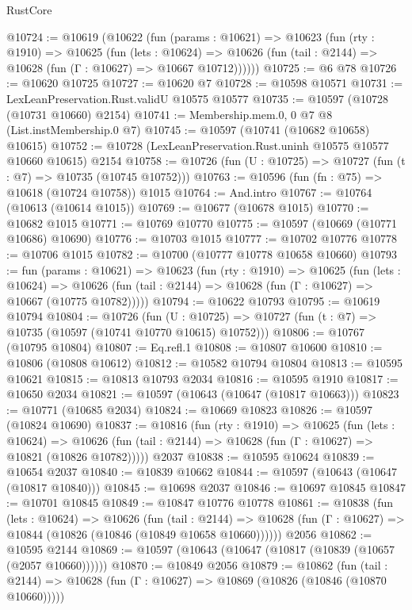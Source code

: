 \begin{lexlean}{RustCore}
\begin{coremodule}
@10724 := @10619
    (@10622
      (fun (params : @10621) =>
      @10623
        (fun (rty : @1910) =>
        @10625
          (fun (lets : @10624) =>
          @10626 (fun (tail : @2144) => @10628 (fun (Γ : @10627) => @10667 @10712))))))
@10725 := @6 @78
@10726 := @10620 @10725
@10727 := @10620 @7
@10728 := @10598 @10571
@10731 := LexLeanPreservation.Rust.validU @10575 @10577
@10735 := @10597 (@10728 (@10731 @10660) @2154)
@10741 := Membership.mem.{0, 0} @7 @8 (List.instMembership.{0} @7)
@10745 := @10597 (@10741 (@10682 @10658) @10615)
@10752 := @10728 (LexLeanPreservation.Rust.uninh @10575 @10577 @10660 @10615) @2154
@10758 := @10726 (fun (U : @10725) => @10727 (fun (t : @7) => @10735 (@10745 @10752)))
@10763 := @10596 (fun (fn : @75) => @10618 (@10724 @10758)) @1015
@10764 := And.intro
@10767 := @10764 (@10613 (@10614 @1015))
@10769 := @10677 (@10678 @1015)
@10770 := @10682 @1015
@10771 := @10769 @10770
@10775 := @10597 (@10669 (@10771 @10686) @10690)
@10776 := @10703 @1015
@10777 := @10702 @10776
@10778 := @10706 @1015
@10782 := @10700 (@10777 @10778 @10658 @10660)
@10793 := fun (params : @10621) =>
  @10623
    (fun (rty : @1910) =>
    @10625
      (fun (lets : @10624) =>
      @10626 (fun (tail : @2144) => @10628 (fun (Γ : @10627) => @10667 (@10775 @10782)))))
@10794 := @10622 @10793
@10795 := @10619 @10794
@10804 := @10726
    (fun (U : @10725) => @10727 (fun (t : @7) => @10735 (@10597 (@10741 @10770 @10615) @10752)))
@10806 := @10767 (@10795 @10804)
@10807 := Eq.refl.{1}
@10808 := @10807 @10600
@10810 := @10806 (@10808 @10612)
@10812 := @10582 @10794 @10804
@10813 := @10595 @10621
@10815 := @10813 @10793 @2034
@10816 := @10595 @1910
@10817 := @10650 @2034
@10821 := @10597 (@10643 (@10647 (@10817 @10663)))
@10823 := @10771 (@10685 @2034)
@10824 := @10669 @10823
@10826 := @10597 (@10824 @10690)
@10837 := @10816
    (fun (rty : @1910) =>
    @10625
      (fun (lets : @10624) =>
      @10626 (fun (tail : @2144) => @10628 (fun (Γ : @10627) => @10821 (@10826 @10782)))))
    @2037
@10838 := @10595 @10624
@10839 := @10654 @2037
@10840 := @10839 @10662
@10844 := @10597 (@10643 (@10647 (@10817 @10840)))
@10845 := @10698 @2037
@10846 := @10697 @10845
@10847 := @10701 @10845
@10849 := @10847 @10776 @10778
@10861 := @10838
    (fun (lets : @10624) =>
    @10626
      (fun (tail : @2144) =>
      @10628 (fun (Γ : @10627) => @10844 (@10826 (@10846 (@10849 @10658 @10660))))))
    @2056
@10862 := @10595 @2144
@10869 := @10597 (@10643 (@10647 (@10817 (@10839 (@10657 (@2057 @10660))))))
@10870 := @10849 @2056
@10879 := @10862
    (fun (tail : @2144) => @10628 (fun (Γ : @10627) => @10869 (@10826 (@10846 (@10870 @10660)))))

\end{coremodule}
\end{lexlean}
